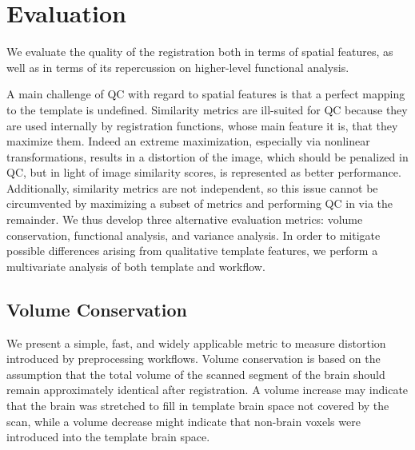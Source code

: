 \section{Evaluation}

We evaluate the quality of the registration both in terms of spatial features, as well as in terms of its repercussion on higher-level functional analysis.

A main challenge of QC with regard to spatial features is that a perfect mapping to the template is undefined.
Similarity metrics are ill-suited for QC because they are used internally by registration functions, whose main feature it is, that they maximize them.
Indeed an extreme maximization, especially via nonlinear transformations, results in a distortion of the image, which should be penalized in QC, but in light of image similarity scores, is represented as better performance.
Additionally, similarity metrics are not independent, so this issue cannot be circumvented by maximizing a subset of metrics and performing QC in via the remainder.
We thus develop three alternative evaluation metrics: volume conservation, functional analysis, and variance analysis.
In order to mitigate possible differences arising from qualitative template features, we perform a multivariate analysis of both template and workflow.

\subsection{Volume Conservation}

We present a simple, fast, and widely applicable metric to measure distortion introduced by preprocessing workflows.
Volume conservation is based on the assumption that the total volume of the scanned segment of the brain should remain approximately identical after registration.
A volume increase may indicate that the brain was stretched to fill in template brain space not covered by the scan, while a volume decrease might indicate that non-brain voxels were introduced into the template brain space.

